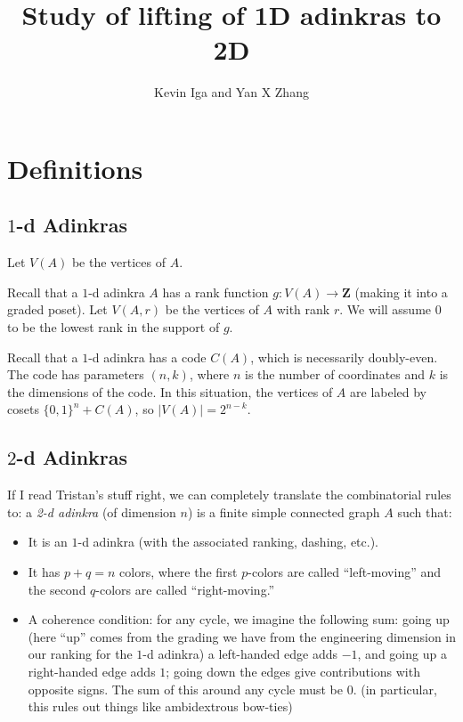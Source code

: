 \documentclass[12pt,twoside,singlespace]{article}
\title{Study of lifting of 1D adinkras to 2D}
\author{Kevin Iga and Yan X Zhang}
\numberwithin{equation}{section}
\theoremstyle{definition}
\newcommand{\ZZ}{\mathbf{Z}}
\begin{document}
\pagestyle{plain}

\maketitle

\section{Definitions}

\subsection{$1$-d Adinkras}

Let $V(A)$ be the vertices of $A$.

Recall that a $1$-d adinkra $A$ has a rank function $g: V(A) \rightarrow \ZZ$ (making it into a graded poset). Let $V(A, r)$ be the vertices of $A$ with rank $r$. We will assume $0$ to be the lowest rank in the support of $g$.

Recall that a $1$-d adinkra has a code $C(A)$, which is necessarily doubly-even. The code has parameters $(n,k)$, where $n$ is the number of coordinates and $k$ is the dimensions of the code. In this situation, the vertices of $A$ are labeled by cosets $\{0,1\}^n + C(A)$, so $|V(A)| = 2^{n-k}$.

\subsection{$2$-d Adinkras}

If I read Tristan's stuff right, we can completely translate the combinatorial rules to: a \emph{2-d adinkra} (of dimension $n$) is a finite simple connected graph $A$ such that:
\begin{itemize}
\item It is an $1$-d adinkra (with the associated ranking, dashing, etc.).
\item It has $p + q = n$ colors, where the first $p$-colors are called ``left-moving'' and the second $q$-colors are called ``right-moving.''
\item A coherence condition: for any cycle, we imagine the following sum: going up (here ``up'' comes from the grading we have from the engineering dimension in our ranking for the $1$-d adinkra) a left-handed edge adds $-1$, and going up a right-handed edge adds $1$; going down the edges give contributions with opposite signs. The sum of this around any cycle must be $0$. (in particular, this rules out things like ambidextrous bow-ties)
\end{itemize} 
\end{document}
